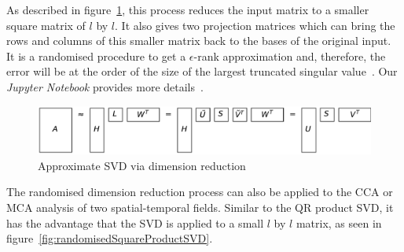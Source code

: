 \documentclass{acm_proc_article-sp}
\begin{document}
As described in figure~\ref{fig:reduceSizeRandomisedSquare}, this process reduces the input matrix to a smaller square matrix of $l$ by $l$. It also gives two projection matrices which can bring the rows and columns of this smaller matrix back to the bases of the original input. It is a randomised procedure to get a $\epsilon$-rank approximation and, therefore, the error will be at the order of the size of the largest truncated singular value~\cite{Martinsson2016, Halko2011}. Our \textit{Jupyter Notebook} provides more details~\cite{Bogaardt2018}.

\begin{figure}[h]
\begin{center}
\includegraphics[width=\columnwidth]{Results/reduceSizeRandomisedSquare.pdf}
\caption[Approximate randomised SVD]{Approximate SVD via dimension reduction}
\label{fig:reduceSizeRandomisedSquare}
\end{center}
\end{figure}
The randomised dimension reduction process can also be applied to the CCA or MCA analysis of two spatial-temporal fields. Similar to the QR product SVD, it has the advantage that the SVD is applied to a small $l$ by $l$ matrix, as seen in figure~\ref{fig:randomisedSquareProductSVD}.
\end{document}
